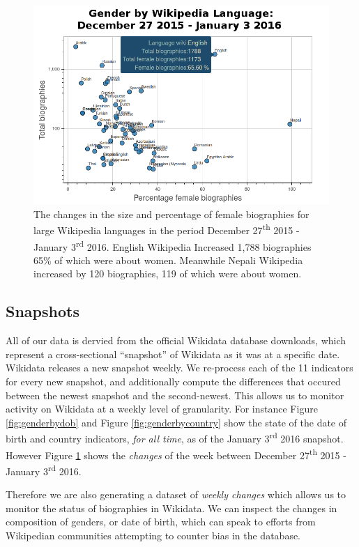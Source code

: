 \documentclass{sig-alternate-05-2015}
\begin{document}
\begin{figure}
\includegraphics[width=\columnwidth]{figures/genderbylang.png} 
\caption{The changes in the size and percentage of female biographies for large Wikipedia languages in the period December 27\textsuperscript{th} 2015 - January 3\textsuperscript{rd} 2016. English Wikipedia Increased 1,788 biographies 65\% of which were about women. Meanwhile Nepali Wikipedia increased by 120 biographies, 119 of which were about women.}
\label{fig:genderbylang}
\end{figure}

\subsection{Snapshots}
All of our data is dervied from the official Wikidata database downloads, which represent a cross-sectional ``snapshot'' of Wikidata as it was at a specific date. Wikidata releases a new snapshot weekly. We re-process each of the 11 indicators for every new snapshot, and additionally compute the differences that occured between the newest snapshot and the second-newest. This allows us to monitor activity on Wikidata at a weekly level of granularity. For instance Figure  \ref{fig:genderbydob} and Figure \ref{fig:genderbycountry} show the state of the date of birth and country indicators, \textit{for all time}, as of the January 3\textsuperscript{rd} 2016 snapshot. However Figure \ref{fig:genderbylang} shows the \textit{changes} of the week between December 27\textsuperscript{th} 2015 - January 3\textsuperscript{rd} 2016.

Therefore we are also generating a dataset of \textit{weekly changes} which allows us to monitor the status of biographies in Wikidata. We can inspect the changes in composition of genders, or date of birth, which can speak to efforts from Wikipedian communities attempting to counter bias in the database. 
\end{document}
